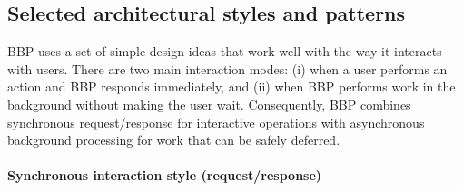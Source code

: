 \subsection{Selected architectural styles and patterns}

BBP uses a set of simple design ideas that work well with the way it interacts with users. There are two main interaction modes: (i) when a user performs an action and BBP responds immediately, and (ii) when BBP performs work in the background without making the user wait. Consequently, BBP combines synchronous request/response for interactive operations with asynchronous background processing for work that can be safely deferred.

\paragraph{Synchronous interaction style (request/response)}
